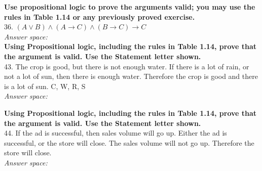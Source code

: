 \documentclass[12pt]{article}
\begin{document}
\noindent
\textbf{Use propositional logic to prove the arguments valid; you may use the rules in Table 1.14 or any previously proved exercise.} \\
36. \( (A \lor B) \land (A \rightarrow C) \land (B \rightarrow C) \rightarrow C \) \\
\textit{Answer space:} \\
\vspace{4cm}
\newpage
\noindent
\textbf{Using Propositional logic, including the rules in Table 1.14, prove that the argument is valid. Use the Statement letter shown.} \\
43. The crop is good, but there is not enough water. If there is a lot of rain, or not a lot of sun, then there is enough water. Therefore the crop is good and there is a lot of sun. C, W, R, S \\
\textit{Answer space:} \\
\vspace{5cm}

\noindent
\textbf{Using Propositional logic, including the rules in Table 1.14, prove that the argument is valid. Use the Statement letter shown.} \\
44. If the ad is successful, then sales volume will go up. Either the ad is successful, or the store will close. The sales volume will not go up. Therefore the store will close. \\
\textit{Answer space:} \\
\vspace{1cm}
\end{document}
